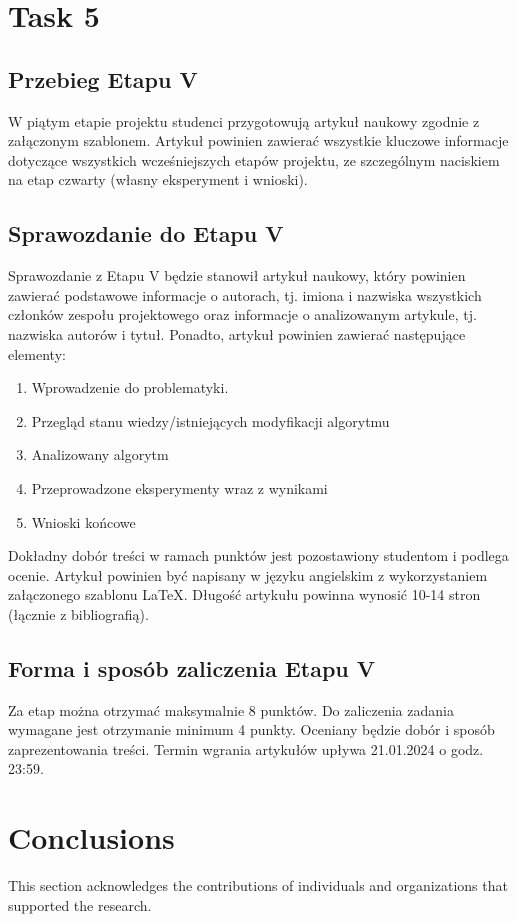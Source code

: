 \documentclass{article}
\begin{document}
\section{Task 5}
\subsection{Przebieg Etapu V}
W piątym etapie projektu studenci przygotowują artykuł naukowy zgodnie
z załączonym szablonem.
Artykuł powinien zawierać wszystkie kluczowe informacje dotyczące
wszystkich wcześniejszych etapów projektu, ze szczególnym naciskiem na etap
czwarty (własny eksperyment i wnioski).

\subsection{Sprawozdanie do Etapu V}
Sprawozdanie z Etapu V będzie stanowił artykuł naukowy, który powinien
zawierać podstawowe informacje o autorach, tj. imiona i nazwiska wszystkich
członków zespołu projektowego oraz informacje o analizowanym artykule, tj.
nazwiska autorów i tytuł. Ponadto, artykuł powinien zawierać następujące
elementy:
\begin{enumerate}
    \item Wprowadzenie do problematyki.
    \item Przegląd stanu wiedzy/istniejących modyfikacji algorytmu
    \item Analizowany algorytm
    \item Przeprowadzone eksperymenty wraz z wynikami
    \item Wnioski końcowe
\end{enumerate}
Dokładny dobór treści w ramach punktów jest pozostawiony studentom
i podlega ocenie.
Artykuł powinien być napisany w języku angielskim z wykorzystaniem
załączonego szablonu LaTeX. Długość artykułu powinna wynosić 10-14 stron
(łącznie z bibliografią).

\subsection{Forma i sposób zaliczenia Etapu V}
Za etap można otrzymać maksymalnie 8 punktów. Do zaliczenia zadania
wymagane jest otrzymanie minimum 4 punkty. Oceniany będzie dobór i sposób
zaprezentowania treści. Termin wgrania artykułów upływa 21.01.2024 o godz.
23:59.

\section{Conclusions}
This section acknowledges the contributions of individuals and organizations that supported the research.



\end{document}
